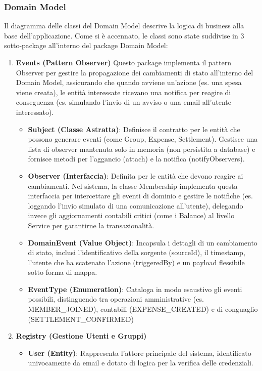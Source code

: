 \subsubsection{Domain Model}
Il diagramma delle classi del Domain Model descrive la logica di business alla base dell'applicazione.
Come si è accennato, le classi sono state suddivise in 3 sotto-package all'interno del package Domain Model:
\begin{enumerate}
    \item \textbf{Events (Pattern Observer)}
    Questo package implementa il pattern Observer per gestire la propagazione dei cambiamenti di stato all'interno del Domain Model, assicurando che quando avviene un’azione (es. una spesa viene creata), le entità interessate ricevano una notifica per reagire di conseguenza (es. simulando l'invio di un avviso o una email all'utente interessato).
    \begin{itemize}
        \item \textbf{Subject (Classe Astratta)}: Definisce il contratto per le entità che possono generare eventi (come Group, Expense, Settlement). Gestisce una lista di observer mantenuta solo in memoria (non persistita a database) e fornisce metodi per l’aggancio (attach) e la notifica (notifyObservers).
        
        \item \textbf{Observer (Interfaccia)}: Definita per le entità che devono reagire ai cambiamenti. Nel sistema, la classe Membership implementa questa interfaccia per intercettare gli eventi di dominio e gestire le notifiche (es. loggando l'invio simulato di una comunicazione all'utente), delegando invece gli aggiornamenti contabili critici (come i Balance) al livello Service per garantirne la transazionalità.
        
        \item \textbf{DomainEvent (Value Object)}: Incapsula i dettagli di un cambiamento di stato, inclusi l'identificativo della sorgente (sourceId), il timestamp, l'utente che ha scatenato l'azione (triggeredBy) e un payload flessibile sotto forma di mappa.
        
        \item \textbf{EventType (Enumeration)}: Cataloga in modo esaustivo gli eventi possibili, distinguendo tra operazioni amministrative (es. MEMBER\_JOINED), contabili (EXPENSE\_CREATED) e di conguaglio (SETTLEMENT\_CONFIRMED)
    \end{itemize}

    \item \textbf{Registry (Gestione Utenti e Gruppi)}
    \begin{itemize}
        \item \textbf{User (Entity)}: Rappresenta l'attore principale del sistema, identificato univocamente da email e dotato di logica per la verifica delle credenziali.
        

\end{itemize}
\end{enumerate}
